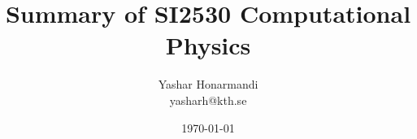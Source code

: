 \documentclass[a4paper, 11pt]{article}
\title{Summary of SI2530 Computational Physics}
\author{Yashar Honarmandi \\ yasharh@kth.se}
\date{\today}
\begin{document}
\maketitle

\begin{abstract}
	
\end{abstract}

\thispagestyle{empty}

\newpage

\tableofcontents

\newpage

\end{document}
